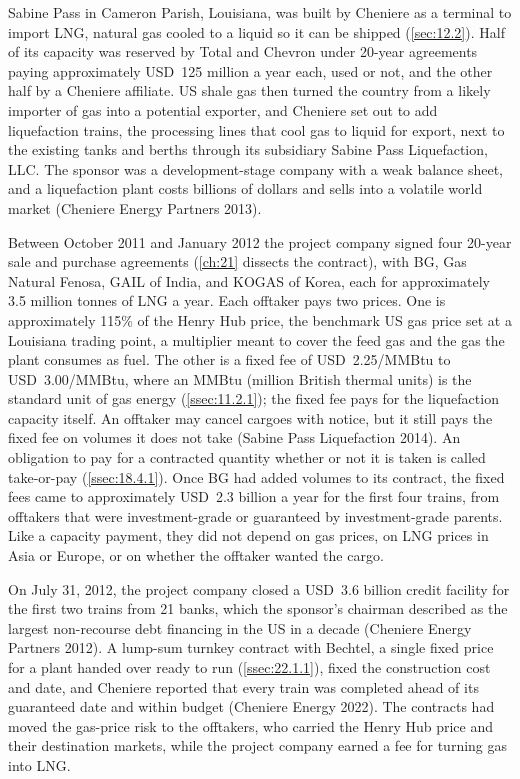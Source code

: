 Sabine Pass in Cameron Parish, Louisiana, was built by Cheniere as a terminal to import LNG, natural gas cooled to a liquid so it can be shipped (\cref{sec:12.2}). Half of its capacity was reserved by Total and Chevron under 20-year agreements paying approximately USD~125 million a year each, used or not, and the other half by a Cheniere affiliate. US shale gas then turned the country from a likely importer of gas into a potential exporter, and Cheniere set out to add liquefaction trains, the processing lines that cool gas to liquid for export, next to the existing tanks and berths through its subsidiary Sabine Pass Liquefaction, LLC. The sponsor was a development-stage company with a weak balance sheet, and a liquefaction plant costs billions of dollars and sells into a volatile world market (Cheniere Energy Partners 2013).

Between October 2011 and January 2012 the project company signed four 20-year sale and purchase agreements (\cref{ch:21} dissects the contract), with BG, Gas Natural Fenosa, GAIL of India, and KOGAS of Korea, each for approximately 3.5 million tonnes of LNG a year. Each offtaker pays two prices. One is approximately 115\% of the Henry Hub price, the benchmark US gas price set at a Louisiana trading point, a multiplier meant to cover the feed gas and the gas the plant consumes as fuel. The other is a fixed fee of USD~2.25/MMBtu to USD~3.00/MMBtu, where an MMBtu (million British thermal units) is the standard unit of gas energy (\cref{ssec:11.2.1}); the fixed fee pays for the liquefaction capacity itself. An offtaker may cancel cargoes with notice, but it still pays the fixed fee on volumes it does not take (Sabine Pass Liquefaction 2014). An obligation to pay for a contracted quantity whether or not it is taken is called take-or-pay (\cref{ssec:18.4.1}). Once BG had added volumes to its contract, the fixed fees came to approximately USD~2.3 billion a year for the first four trains, from offtakers that were investment-grade or guaranteed by investment-grade parents. Like a capacity payment, they did not depend on gas prices, on LNG prices in Asia or Europe, or on whether the offtaker wanted the cargo.

On July 31, 2012, the project company closed a USD~3.6 billion credit facility for the first two trains from 21 banks, which the sponsor's chairman described as the largest non-recourse debt financing in the US in a decade (Cheniere Energy Partners 2012). A lump-sum turnkey contract with Bechtel, a single fixed price for a plant handed over ready to run (\cref{ssec:22.1.1}), fixed the construction cost and date, and Cheniere reported that every train was completed ahead of its guaranteed date and within budget (Cheniere Energy 2022). The contracts had moved the gas-price risk to the offtakers, who carried the Henry Hub price and their destination markets, while the project company earned a fee for turning gas into LNG.

